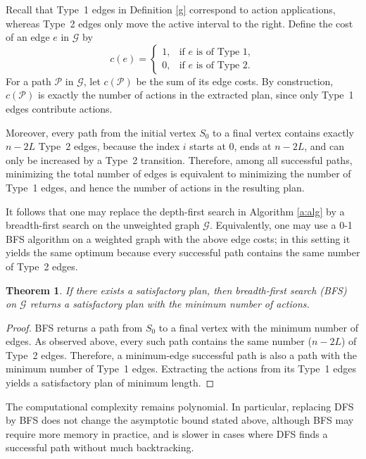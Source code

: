 \documentclass[a4paper,fleqn]{cas-dc}
\newtheorem{Theorem}{Theorem}
\begin{document}
Recall that Type~1 edges in Definition \ref{g} correspond to action applications, whereas
Type~2 edges only move the active interval to the right.
Define the cost of an edge $e$ in $\mathcal{G}$ by
\[
c(e)=
\begin{cases}
1, & \text{if $e$ is of Type~1},\\
0, & \text{if $e$ is of Type~2}.
\end{cases}
\]
For a path $\mathcal{P}$ in $\mathcal{G}$, let $c(\mathcal{P})$ be the sum of its edge costs.
By construction, $c(\mathcal{P})$ is exactly the number of actions in the extracted plan,
since only Type~1 edges contribute actions.

Moreover, every path from the initial vertex $S_0$ to a final vertex contains exactly
$n-2L$ Type~2 edges, because the index $i$ starts at $0$, ends at $n-2L$, and can only be
increased by a Type~2 transition. Therefore, among all successful paths, minimizing the total
number of edges is equivalent to minimizing the number of Type~1 edges, and hence the number
of actions in the resulting plan.

It follows that one may replace the depth-first search in Algorithm \ref{a:alg} by a
breadth-first search on the unweighted graph $\mathcal{G}$. 
Equivalently, one may use a 0-1 BFS algorithm on a weighted graph with the above edge costs; in this setting it yields the same optimum because every successful path contains the same number of Type~2 edges.

\begin{Theorem}\label{t:shortest}
    If there exists a satisfactory plan, then breadth-first search (BFS) on $\mathcal{G}$ returns a
satisfactory plan with the minimum number of actions.
\end{Theorem}

\begin{proof}{}
BFS returns a path from $S_0$ to a final vertex with the minimum number of
edges. As observed above, every such path contains the same number ($n-2L$) of Type~2 edges.
Therefore, a minimum-edge successful path is also a path with the minimum number of Type~1 edges.
Extracting the actions from its Type~1 edges yields a satisfactory plan of minimum length.
\end{proof}

The computational complexity remains polynomial. In particular, replacing DFS by BFS
does not change the asymptotic bound stated above, although BFS may require more memory in practice,
and is slower in cases where DFS finds a successful path without much backtracking.
\end{document}
